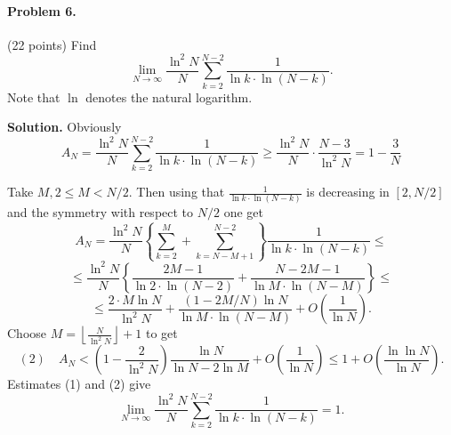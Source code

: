 \documentclass{article}
\begin{document}
\paragraph{Problem 6.} (22 points)
Find
\[
\lim_{N \to \infty} \frac{\ln^2 N}{N} \sum_{k=2}^{N-2} \frac{1}{\ln k \cdot \ln(N-k)}.
\]
Note that $\ln$ denotes the natural logarithm.

\textbf{Solution.} Obviously
\begin{equation}
A_N = \frac{\ln^2 N}{N} \sum_{k=2}^{N-2} \frac{1}{\ln k \cdot \ln(N-k)} \geq \frac{\ln^2 N}{N} \cdot \frac{N-3}{\ln^2 N} = 1 - \frac{3}{N}
\end{equation}

Take $M, 2 \leq M < N/2$. Then using that $\frac{1}{\ln k \cdot \ln(N - k)}$ is decreasing in $[2, N/2]$ and the symmetry with respect to $N/2$ one get
\[
A_N = \frac{\ln^2 N}{N} \left\{ \sum_{k=2}^{M} + \sum_{k=N-M+1}^{N-2} \right\} \frac{1}{\ln k \cdot \ln(N - k)} \leq
\]
\[
\leq \frac{\ln^2 N}{N} \left\{ \frac{2M - 1}{\ln 2 \cdot \ln(N - 2)} + \frac{N - 2M - 1}{\ln M \cdot \ln(N - M)} \right\} \leq
\]
\[
\leq \frac{2 \cdot M \ln N}{\ln^2 N} + \frac{(1 - 2M/N) \ln N}{\ln M \cdot \ln(N - M)} + O\left( \frac{1}{\ln N} \right).
\]
Choose $M = \left\lfloor \frac{N}{\ln^2 N} \right\rfloor + 1$ to get
\[
(2) \quad A_N < \left(1 - \frac{2}{\ln^2 N}\right) \frac{\ln N}{\ln N - 2 \ln M} + O\left( \frac{1}{\ln N} \right) \leq 1 + O\left( \frac{\ln \ln N}{\ln N} \right).
\]
Estimates (1) and (2) give
\[
\lim_{N \to \infty} \frac{\ln^2 N}{N} \sum_{k=2}^{N-2} \frac{1}{\ln k \cdot \ln(N - k)} = 1.
\]
\end{document}
